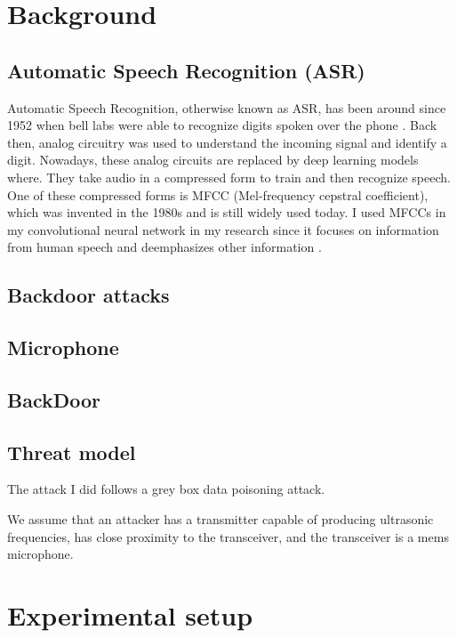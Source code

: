 \documentclass{article}
\theoremstyle{definition}
\theoremstyle{remark}
\begin{document}
\section{Background}
\subsection{Automatic Speech Recognition (ASR)}
Automatic Speech Recognition, otherwise known as ASR, has been around since 1952 when bell labs were able to recognize digits spoken over the phone \cite{ASRHistory}. Back then, analog circuitry was used to understand the incoming signal and identify a digit. Nowadays, these analog circuits are replaced by deep learning models where. They take audio in a compressed form to train and then recognize speech. One of these compressed forms is MFCC (Mel-frequency cepstral coefficient), which was invented in the 1980s and is still widely used today. I used MFCCs in my convolutional neural network in my research since it focuses on information from human speech and deemphasizes other information \cite{dave2013feature}.
\subsection{Backdoor attacks}
\subsection{Microphone}
\subsection{BackDoor}
\cite{roy_backdoor_2017}
\subsection{Threat model}
The attack I did follows a grey box data poisoning attack. 

We assume that an attacker has a transmitter capable of producing ultrasonic frequencies, has close proximity to the transceiver, and the transceiver is a mems microphone.

\section{Experimental setup}
\end{document}
